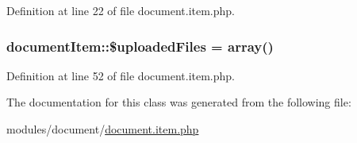 Definition at line 22 of file document.\-item.\-php.

\hypertarget{classdocumentItem_a70d4321ea0edfb6c1fb0775ced8a6b41}{
\subsubsection[{\$uploaded\-Files}]{\setlength{\rightskip}{0pt plus 5cm}document\-Item\-::\$uploaded\-Files = array()}}\label{classdocumentItem_a70d4321ea0edfb6c1fb0775ced8a6b41}


Definition at line 52 of file document.\-item.\-php.



The documentation for this class was generated from the following file\-:\begin{DoxyCompactItemize}
\item 
modules/document/\hyperlink{document_8item_8php}{document.\-item.\-php}\end{DoxyCompactItemize}
